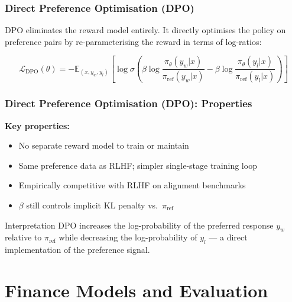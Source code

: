 \documentclass[9pt,t]{beamer}
\begin{document}
\begin{frame}
\frametitle{Direct Preference Optimisation (DPO)}

\begin{underhood}
DPO eliminates the reward model entirely. It directly optimises the policy
on preference pairs by re-parameterising the reward in terms of log-ratios:

\[
  \mathcal{L}_{\text{DPO}}(\theta) = -\mathbb{E}_{(x,y_w,y_l)}\!\left[
    \log \sigma\!\left(
      \beta \log \frac{\pi_\theta(y_w|x)}{\pi_{\text{ref}}(y_w|x)}
      - \beta \log \frac{\pi_\theta(y_l|x)}{\pi_{\text{ref}}(y_l|x)}
    \right)
  \right]
\]
\end{underhood}
\end{frame}

\begin{frame}
\frametitle{Direct Preference Optimisation (DPO): Properties}

\textbf{Key properties:}
\begin{itemize}
  \item No separate reward model to train or maintain
  \item Same preference data as RLHF; simpler single-stage training loop
  \item Empirically competitive with RLHF on alignment benchmarks
  \item $\beta$ still controls implicit KL penalty vs.\ $\pi_{\text{ref}}$
\end{itemize}

\medskip
\begin{block}{Interpretation}
  DPO increases the log-probability of the preferred response $y_w$ relative
  to $\pi_{\text{ref}}$ while decreasing the log-probability of $y_l$ ---
  a direct implementation of the preference signal.
\end{block}
\end{frame}

\section{Finance Models and Evaluation}
\end{document}

